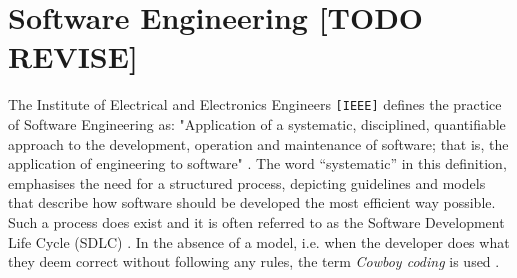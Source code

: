 
\chapter{Software Engineering [TODO REVISE]}
\label{ch:software-engineering}
The Institute of Electrical and Electronics Engineers \texttt{[IEEE]} defines the practice of Software Engineering as: "Application of a systematic, disciplined, quantifiable approach to the development, operation and maintenance of software; that is, the application of engineering to software" \cite[p.~421]{8016712}. The word ``systematic'' in this definition, emphasises the need for a structured process, depicting guidelines and models that describe how software should be developed the most efficient way possible. Such a process does exist and it is often referred to as the Software Development Life Cycle (SDLC) \cite[p.~420]{8016712}. In the absence of a model, i.e. when the developer does what they deem correct without following any rules, the term \emph{Cowboy coding} is used \cite[p.~34]{landry2011iterative}.


\newpage

